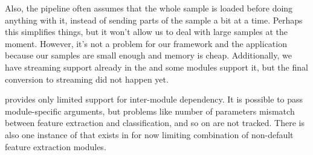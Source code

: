 Also, the pipeline often assumes that the whole sample is loaded before doing
anything with it, instead of sending parts of the sample a bit at a time.
Perhaps this simplifies things, but it won't allow us to deal with large
samples at the moment. However, it's not a problem for our framework
and the application because our samples are small enough and memory is cheap. Additionally,
we have streaming support already in the  and some modules support it, but
the final conversion to streaming did not happen yet.

{\marf} provides only limited support for inter-module dependency. It is possible
to pass module-specific arguments, but problems like
number of parameters mismatch between feature extraction and classification,
and so on are not tracked.
There is also one instance of  that exists in 
for now limiting combination of non-default feature extraction modules.

